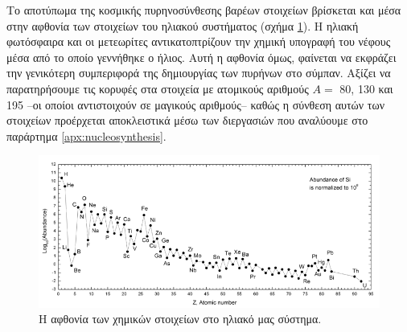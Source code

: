 Το αποτύπωμα της κοσμικής πυρηνοσύνθεσης βαρέων στοιχείων βρίσκεται και μέσα στην αφθονία των στοιχείων του ηλιακού συστήματος (σχήμα \ref{fig:solar_abundance_of_elements}). Η ηλιακή φωτόσφαιρα και οι μετεωρίτες αντικατοπτρίζουν την χημική υπογραφή του νέφους μέσα από το οποίο γεννήθηκε ο ήλιος. Αυτή η αφθονία όμως, φαίνεται να εκφράζει την γενικότερη συμπεριφορά της δημιουργίας των πυρήνων στο σύμπαν. Αξίζει να παρατηρήσουμε τις κορυφές στα στοιχεία με ατομικούς αριθμούς $A =$ 80, 130 και 195 --οι οποίοι αντιστοιχούν σε μαγικούς αριθμούς-- καθώς η σύνθεση αυτών των στοιχείων προέρχεται αποκλειστικά μέσω των διεργασιών που αναλύουμε στο παράρτημα \ref{apx:nucleosynthesis}.

\begin{figure}
    \centering
    \includegraphics[scale=0.45]{Figures/SolarSystemAbundances.png} 
    \caption{Η αφθονία των χημικών στοιχείων στο ηλιακό μας σύστημα.}
    \label{fig:solar_abundance_of_elements}
\end{figure}

